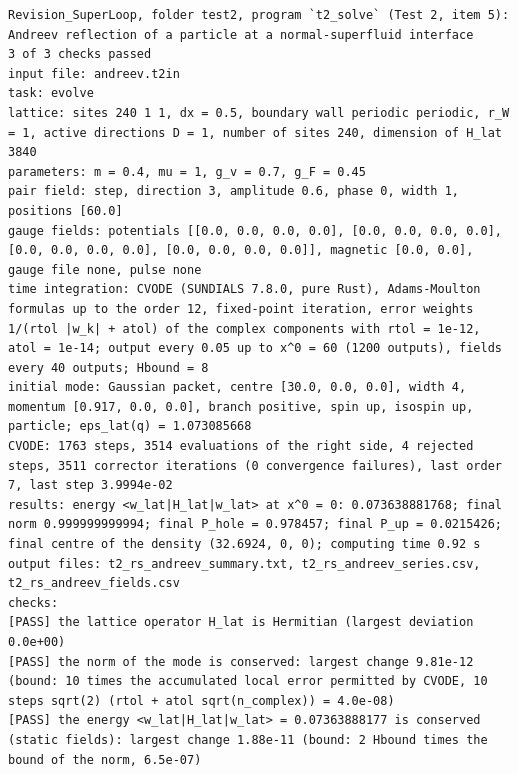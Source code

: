 \documentclass[
  10pt,
]{article}
\begin{document}
\begin{verbatim}
Revision_SuperLoop, folder test2, program `t2_solve` (Test 2, item 5): Andreev reflection of a particle at a normal-superfluid interface
3 of 3 checks passed
input file: andreev.t2in
task: evolve
lattice: sites 240 1 1, dx = 0.5, boundary wall periodic periodic, r_W = 1, active directions D = 1, number of sites 240, dimension of H_lat 3840
parameters: m = 0.4, mu = 1, g_v = 0.7, g_F = 0.45
pair field: step, direction 3, amplitude 0.6, phase 0, width 1, positions [60.0]
gauge fields: potentials [[0.0, 0.0, 0.0, 0.0], [0.0, 0.0, 0.0, 0.0], [0.0, 0.0, 0.0, 0.0], [0.0, 0.0, 0.0, 0.0]], magnetic [0.0, 0.0], gauge file none, pulse none
time integration: CVODE (SUNDIALS 7.8.0, pure Rust), Adams-Moulton formulas up to the order 12, fixed-point iteration, error weights 1/(rtol |w_k| + atol) of the complex components with rtol = 1e-12, atol = 1e-14; output every 0.05 up to x^0 = 60 (1200 outputs), fields every 40 outputs; Hbound = 8
initial mode: Gaussian packet, centre [30.0, 0.0, 0.0], width 4, momentum [0.917, 0.0, 0.0], branch positive, spin up, isospin up, particle; eps_lat(q) = 1.073085668
CVODE: 1763 steps, 3514 evaluations of the right side, 4 rejected steps, 3511 corrector iterations (0 convergence failures), last order 7, last step 3.9994e-02
results: energy <w_lat|H_lat|w_lat> at x^0 = 0: 0.073638881768; final norm 0.999999999994; final P_hole = 0.978457; final P_up = 0.0215426; final centre of the density (32.6924, 0, 0); computing time 0.92 s
output files: t2_rs_andreev_summary.txt, t2_rs_andreev_series.csv, t2_rs_andreev_fields.csv
checks:
[PASS] the lattice operator H_lat is Hermitian (largest deviation 0.0e+00)
[PASS] the norm of the mode is conserved: largest change 9.81e-12 (bound: 10 times the accumulated local error permitted by CVODE, 10 steps sqrt(2) (rtol + atol sqrt(n_complex)) = 4.0e-08)
[PASS] the energy <w_lat|H_lat|w_lat> = 0.07363888177 is conserved (static fields): largest change 1.88e-11 (bound: 2 Hbound times the bound of the norm, 6.5e-07)
\end{verbatim}
\end{document}
